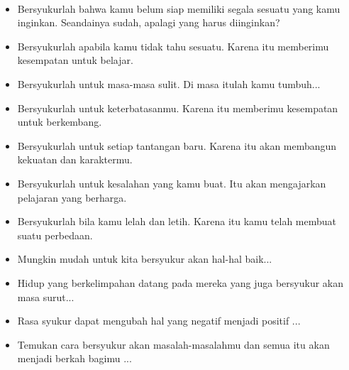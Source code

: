 {~}

\begin{itemize}[label=]
\item Bersyukurlah bahwa kamu belum siap memiliki segala sesuatu yang kamu inginkan. Seandainya sudah, apalagi yang harus diinginkan?


\item Bersyukurlah apabila kamu tidak tahu sesuatu. Karena itu memberimu kesempatan untuk belajar.

\item Bersyukurlah untuk masa-masa sulit. Di masa itulah kamu tumbuh...

\item Bersyukurlah untuk keterbatasanmu. Karena itu memberimu kesempatan untuk berkembang.
\end{itemize}

\begin{itemize}[label=]
\item Bersyukurlah untuk setiap tantangan baru. Karena itu akan membangun kekuatan dan karaktermu.

\item Bersyukurlah untuk kesalahan yang kamu buat. Itu akan mengajarkan pelajaran yang berharga.

\item Bersyukurlah bila kamu lelah dan letih. Karena itu kamu telah membuat suatu perbedaan.

\item Mungkin mudah untuk kita bersyukur akan hal-hal baik...

\item Hidup yang berkelimpahan datang pada mereka yang juga bersyukur akan masa surut...

\item Rasa syukur dapat mengubah hal yang negatif menjadi positif ...

\item Temukan cara bersyukur akan masalah-masalahmu dan semua itu akan menjadi berkah bagimu ...
\end{itemize}

